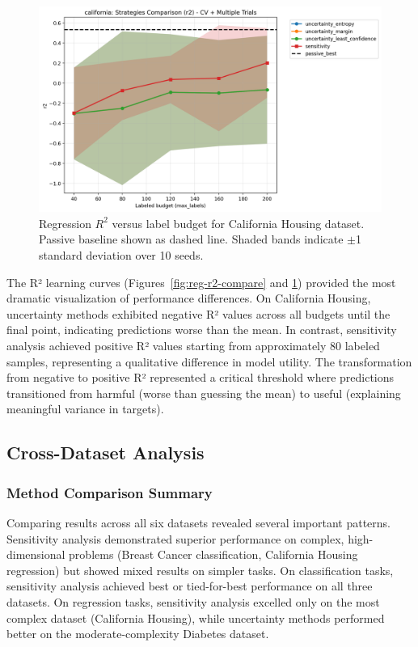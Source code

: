 \documentclass[conference]{IEEEtran}
\begin{document}
\begin{figure}[t]
\centering
\includegraphics[width=0.95\columnwidth]{figures/reg_california_comparison_r2.png}
\caption{Regression $R^2$ versus label budget for California Housing dataset. Passive baseline shown as dashed line. Shaded bands indicate $\pm$1 standard deviation over 10 seeds.}
\label{fig:california-r2-compare}
\end{figure}

The R² learning curves (Figures~\ref{fig:reg-r2-compare} and \ref{fig:california-r2-compare}) provided the most dramatic visualization of performance differences. On California Housing, uncertainty methods exhibited negative R² values across all budgets until the final point, indicating predictions worse than the mean. In contrast, sensitivity analysis achieved positive R² values starting from approximately 80 labeled samples, representing a qualitative difference in model utility. The transformation from negative to positive R² represented a critical threshold where predictions transitioned from harmful (worse than guessing the mean) to useful (explaining meaningful variance in targets).

\subsection{Cross-Dataset Analysis}

\subsubsection{Method Comparison Summary}

Comparing results across all six datasets revealed several important patterns. Sensitivity analysis demonstrated superior performance on complex, high-dimensional problems (Breast Cancer classification, California Housing regression) but showed mixed results on simpler tasks. On classification tasks, sensitivity analysis achieved best or tied-for-best performance on all three datasets. On regression tasks, sensitivity analysis excelled only on the most complex dataset (California Housing), while uncertainty methods performed better on the moderate-complexity Diabetes dataset.
\end{document}
